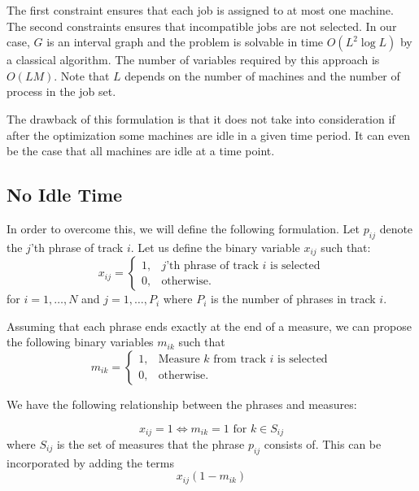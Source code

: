 \documentclass[11pt,a4paper]{article}
\begin{document}
The first constraint ensures that each job is assigned to at most one machine. The second constraints ensures that incompatible jobs are not selected. In our case, $ G $ is an interval graph and the problem is solvable in time $ O(L^2 \log L) $ by a classical algorithm. The number of variables required by this approach is $ O(LM) $. Note that $ L $ depends on the number of machines and the number of process in the job set.

The drawback of this formulation is that it does not take into consideration if after the optimization some machines are idle in a given time period. It can even be the case that all machines are idle at a time point.  


\subsection{No Idle Time}

In order to overcome this, we will define the following formulation. Let $ p_{ij} $ denote the $ j $'th phrase of track $ i $. Let us define the binary variable $x_{ij}$ such that:
\begin{equation}
x_{ij} =   \begin{cases}%
1,      & \text{$j$'th phrase of track $i$ is selected}\\
0, & \text{otherwise.}
\end{cases}
\end{equation}
for $ i = 1, \dots ,N $ and $ j=1, \dots ,P_i  $ where $P_i$ is the number of phrases in track $i$.


Assuming that each phrase ends exactly at the end of a measure, we can propose the following binary variables $m_{ik}$ such that
\begin{equation}
m_{ik} =   \begin{cases}%
1,      & \text{Measure $k$ from track $i$ is selected}\\
0, & \text{otherwise.}
\end{cases}
\end{equation}

We have the following relationship between the phrases and measures:

\begin{equation}\label{eq:phrasemeasure}
x_{ij} = 1 \iff m_{ik}=1 \mbox{ for } k \in S_{ij}
\end{equation}
where $S_{ij}$ is the set of measures that the phrase $p_{ij}$ consists of. This can be incorporated by adding the terms 
\begin{equation}
x_{ij}(1-m_{ik})
\end{equation}
\end{document}
